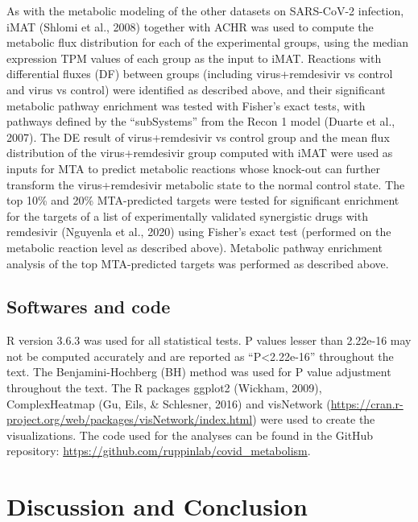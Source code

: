 \documentclass[12pt,twoside,openany,\mydriver]{thesis}  %
\begin{document}
As with the metabolic modeling of the other datasets on SARS-CoV-2 infection, iMAT (Shlomi et al., 2008) together with ACHR was used to compute the metabolic flux distribution for each of the experimental groups, using the median expression TPM values of each group as the input to iMAT. Reactions with differential fluxes (DF) between groups (including virus+remdesivir vs control and virus vs control) were identified as described above, and their significant metabolic pathway enrichment was tested with Fisher's exact tests, with pathways defined by the ``subSystems'' from the Recon 1 model (Duarte et al., 2007). The DE result of virus+remdesivir vs control group and the mean flux distribution of the virus+remdesivir group computed with iMAT were used as inputs for MTA to predict metabolic reactions whose knock-out can further transform the virus+remdesivir metabolic state to the normal control state. The top 10\% and 20\% MTA-predicted targets were tested for significant enrichment for the targets of a list of experimentally validated synergistic drugs with remdesivir (Nguyenla et al., 2020) using Fisher's exact test (performed on the metabolic reaction level as described above). Metabolic pathway enrichment analysis of the top MTA-predicted targets was performed as described above.

\hypertarget{softwares-and-code-2}{%
\subsection{Softwares and code}\label{softwares-and-code-2}}

R version 3.6.3 was used for all statistical tests. P values lesser than 2.22e-16 may not be computed accurately and are reported as ``P\textless{}2.22e-16'' throughout the text. The Benjamini-Hochberg (BH) method was used for P value adjustment throughout the text. The R packages ggplot2 (Wickham, 2009), ComplexHeatmap (Gu, Eils, \& Schlesner, 2016) and visNetwork (\url{https://cran.r-project.org/web/packages/visNetwork/index.html}) were used to create the visualizations. The code used for the analyses can be found in the GitHub repository: \url{https://github.com/ruppinlab/covid_metabolism}.

\hypertarget{discussion-and-conclusion-2}{%
\section{Discussion and Conclusion}\label{discussion-and-conclusion-2}}
\end{document}
